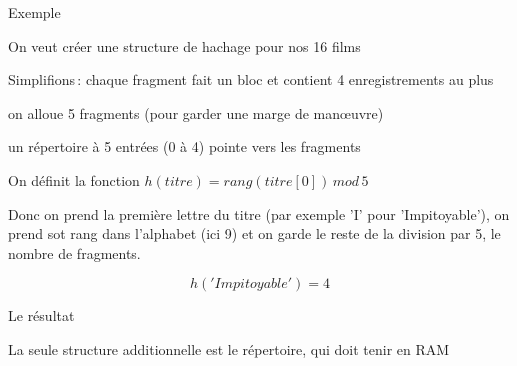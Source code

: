 \begin{frame}{Exemple}

On veut créer une structure de hachage pour nos 16 films

\vfill

Simplifions\,: chaque fragment fait un bloc et contient 4 enregistrements au plus


\vfill

\begin{redbullet}
  \item on alloue 5 fragments (pour garder une marge de man{\oe}uvre)
  \item un \alert{répertoire} à 5 entrées (0 à 4) pointe vers les fragments
   \item On définit la fonction $h(titre) = rang(titre[0])\, mod\, 5$
\end{redbullet}

\vfill
\begin{blocgauche}
Donc on prend la première lettre du titre (par exemple 'I' pour 'Impitoyable'), on
prend sot rang dans l'alphabet (ici 9) et on garde le reste de la division par 5, le nombre de fragments.
\smallskip

$$h('Impitoyable')= 4$$
\end{blocgauche}

\end{frame}
\begin{frame}{Le résultat}


\vfill
\begin{blocgauche}
La seule structure additionnelle est le répertoire, qui \alert{doit} tenir en RAM
\end{blocgauche}
\end{frame}
